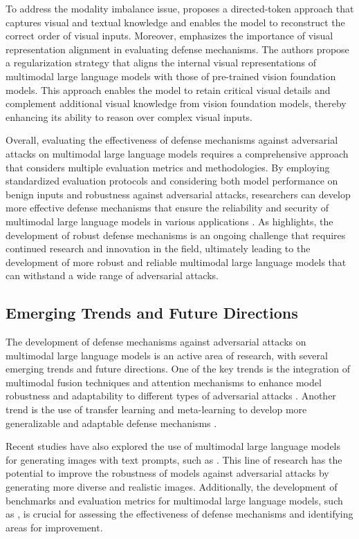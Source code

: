 \documentclass[11pt,a4paper]{article}
\begin{document}
To address the modality imbalance issue, \cite{arxiv:2508.14264} proposes a directed-token approach that captures visual and textual knowledge and enables the model to reconstruct the correct order of visual inputs. Moreover, \cite{arxiv:2509.07979} emphasizes the importance of visual representation alignment in evaluating defense mechanisms. The authors propose a regularization strategy that aligns the internal visual representations of multimodal large language models with those of pre-trained vision foundation models. This approach enables the model to retain critical visual details and complement additional visual knowledge from vision foundation models, thereby enhancing its ability to reason over complex visual inputs.

Overall, evaluating the effectiveness of defense mechanisms against adversarial attacks on multimodal large language models requires a comprehensive approach that considers multiple evaluation metrics and methodologies. By employing standardized evaluation protocols and considering both model performance on benign inputs and robustness against adversarial attacks, researchers can develop more effective defense mechanisms that ensure the reliability and security of multimodal large language models in various applications \cite{arxiv:2408.15998}. As \cite{arxiv:2410.13859} highlights, the development of robust defense mechanisms is an ongoing challenge that requires continued research and innovation in the field, ultimately leading to the development of more robust and reliable multimodal large language models that can withstand a wide range of adversarial attacks.


\subsection{Emerging Trends and Future Directions}


The development of defense mechanisms against adversarial attacks on multimodal large language models is an active area of research, with several emerging trends and future directions. One of the key trends is the integration of multimodal fusion techniques and attention mechanisms to enhance model robustness and adaptability to different types of adversarial attacks \cite{arxiv:2407.15272}. Another trend is the use of transfer learning and meta-learning to develop more generalizable and adaptable defense mechanisms \cite{arxiv:2306.09093}. 

Recent studies have also explored the use of multimodal large language models for generating images with text prompts, such as \cite{arxiv:2305.17216}. This line of research has the potential to improve the robustness of models against adversarial attacks by generating more diverse and realistic images. Additionally, the development of benchmarks and evaluation metrics for multimodal large language models, such as \cite{arxiv:2408.08632}, is crucial for assessing the effectiveness of defense mechanisms and identifying areas for improvement.
\end{document}
